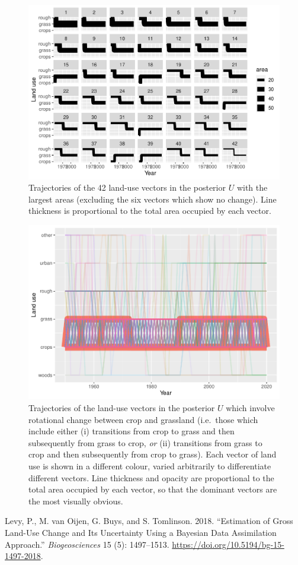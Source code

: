 \documentclass[
]{book}
\begin{document}
\begin{figure}
\centering
\includegraphics{Results_ni_files/figure-latex/plotv2-1.pdf}
\caption{\label{fig:plotv2}Trajectories of the 42 land-use vectors in the posterior \(U\) with the largest areas (excluding the six vectors which show no change). Line thickness is proportional to the total area occupied by each vector.}
\end{figure}

\begin{figure}
\centering
\includegraphics{Results_ni_files/figure-latex/plotcgr-1.pdf}
\caption{\label{fig:plotcgr}Trajectories of the land-use vectors in the posterior \(U\) which involve rotational change between crop and grassland (i.e.~those which include either (i) transitions from crop to grass and then subsequently from grass to crop, \emph{or} (ii) transitions from grass to crop and then subsequently from crop to grass). Each vector of land use is shown in a different colour, varied arbitrarily to differentiate different vectors. Line thickness and opacity are proportional to the total area occupied by each vector, so that the dominant vectors are the most visually obvious.}
\end{figure}

\hypertarget{refs}{}
\leavevmode\hypertarget{ref-Levy2018}{}%
Levy, P., M. van Oijen, G. Buys, and S. Tomlinson. 2018. ``Estimation of Gross Land-Use Change and Its Uncertainty Using a Bayesian Data Assimilation Approach.'' \emph{Biogeosciences} 15 (5): 1497--1513. \url{https://doi.org/10.5194/bg-15-1497-2018}.
\end{document}
